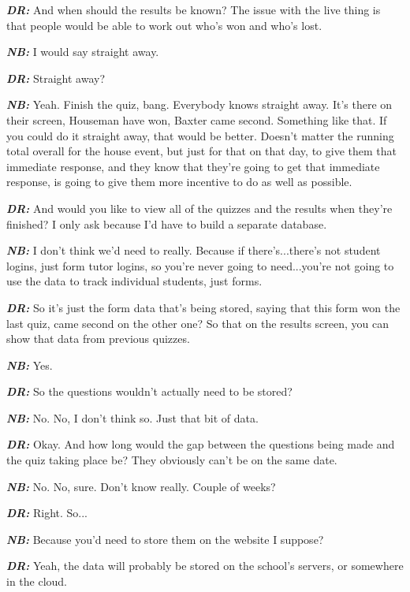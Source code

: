 \textit{\textbf{DR:}} And when should the results be known? The issue with the live thing is that people would be able to work out who's won and who's lost.

\textit{\textbf{NB:}} I would say straight away.

\textit{\textbf{DR:}} Straight away?

\textit{\textbf{NB:}} Yeah. Finish the quiz, bang. Everybody knows straight away. It's there on their screen, Houseman have won, Baxter came second. Something like that. If you could do it straight away, that would be better. Doesn't matter the running total overall for the house event, but just for that on that day, to give them that immediate response, and they know that they're going to get that immediate response, is going to give them more incentive to do as well as possible.

\textit{\textbf{DR:}} And would you like to view all of the quizzes and the results when they're finished? I only ask because I'd have to build a separate database.

\textit{\textbf{NB:}} I don't think we'd need to really. Because if there's...there's not student logins, just form tutor logins, so you're never going to need...you're not going to use the data to track individual students, just forms.

\textit{\textbf{DR:}} So it's just the form data that's being stored, saying that this form won the last quiz, came second on the other one? So that on the results screen, you can show that data from previous quizzes. 

\textit{\textbf{NB:}} Yes.

\textit{\textbf{DR:}} So the questions wouldn't actually need to be stored?

\textit{\textbf{NB:}} No. No, I don't think so. Just that bit of data.

\textit{\textbf{DR:}} Okay. And how long would the gap between the questions being made and the quiz taking place be? They obviously can't be on the same date.

\textit{\textbf{NB:}} No. No, sure. Don't know really. Couple of weeks?

\textit{\textbf{DR:}} Right. So...

\textit{\textbf{NB:}} Because you'd need to store them on the website I suppose?

\textit{\textbf{DR:}} Yeah, the data will probably be stored on the school's servers, or somewhere in the cloud.

